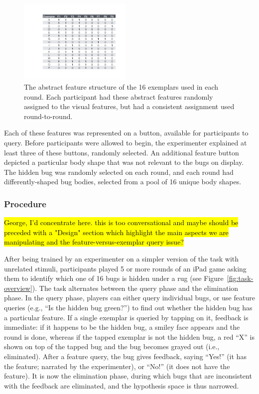 \documentclass[10pt,letterpaper]{article}
\begin{document}
\begin{figure}[h]
  \centering
  \includegraphics[width=0.48\textwidth]{figures/feature_table}
  \caption{The abstract feature structure of the 16 exemplars used in each round. 
Each participant had these abstract features randomly assigned to the visual 
features, but had a consistent assignment used round-to-round.}
  \label{fig:feature_table}
\end{figure} 

Each of these features was represented on a button, available for participants to query. Before 
participants were allowed to begin, the experimenter explained at least three of 
these buttons, randomly selected. An additional feature button depicted a particular 
body shape that was not relevant to the bugs on display. The hidden bug was 
randomly selected on each round, and each round had differently-shaped bug 
bodies, selected from a pool of 16 unique body shapes.

\subsubsection{Procedure}

\hl{George, I'd concentrate here.  this is too conversational and maybe
should be preceded with a "Design" section which highlight the main
aspects we are manipulating and the feature-versus-exemplar query issue?}

After being trained by an experimenter on a simpler version of the task with 
unrelated stimuli, participants played 5 or more 
rounds of an iPad game asking them to identify which one of 16 bugs is hidden 
under a rug (see Figure~\ref{fig:task-overview}). The task alternates between the 
query phase and the elimination phase. In the query phase, players can either query 
individual bugs, or use feature queries (e.g., ``Is the hidden bug green?'') to find out 
whether the hidden bug has a particular feature. If a single exemplar is queried by 
tapping on it, feedback is immediate: if it happens to be the hidden bug, a smiley 
face appears and the round is done, whereas if the tapped exemplar is not the 
hidden bug, a red ``X'' is shown on top of the tapped bug and the bug becomes 
grayed out (i.e., eliminated). After a feature query, the bug gives feedback, saying 
``Yes!'' (it has the feature; narrated by the experimenter), or ``No!'' (it does not have 
the feature). It is now the elimination phase, during which bugs that are inconsistent 
with the feedback are eliminated, and the hypothesis space is thus narrowed. 
\end{document}
